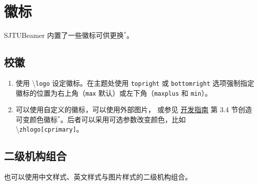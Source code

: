 \documentclass[
    UTF8,
    heading=true,
    12pt,
    a4paper
]{ctexrep}
\newenvironment{commentlist}
{\begin{enumerate}\small}
{\end{enumerate}}
\newcommand{\cmd}[1]{\textbackslash{}\texttt{#1}}
\newcommand{\opt}[1]{\texttt{#1}}
\def\themename{\textsf{SJTUBeamer}}
\begin{document}
\chapter{徽标}

\themename{} 内置了一些徽标可供更换$^*$。

\section{校徽}

\begin{tcbitemize}[raster rows=2, raster
    columns=3, raster every box/.style={
        center title,
        valign=center,
        halign=center,
        fonttitle=\ttfamily,
        colback=white}]
  \tcbitem[raster multicolumn=2,blankest]
  \begin{tcbitemize}[raster columns=2]
    \tcbitem[title={\cmd{zhlogo}}]
    \hbox{\resizebox{!}{1cm}{\zhlogo}}

    \tcbitem[title={\cmd{enlogo}}]
    \hbox{\resizebox{!}{1cm}{\enlogo}}

    \tcbitem[title={\cmd{sjtubadge}},height=3.5cm]
    \resizebox{!}{2cm}{\sjtubadge{}}

    \tcbitem[title={\cmd{dlogo}},height=3.5cm]
    \resizebox{3cm}{!}{\dlogo{}}
  \end{tcbitemize}
  \tcbitem[title={\cmd{vlogo}}]
  \resizebox{!}{4.8cm}{\vlogo{}}
\end{tcbitemize}


\begin{commentlist}
  \item 使用 \cmd{logo} 设定徽标。在主题处使用 \opt{topright}
  或 \opt{bottomright} 选项强制指定徽标的位置为右上角（\opt{max}
  默认）或左下角（\opt{maxplus} 和 \opt{min}）。
  \item 可以使用自定义的徽标，可以使用外部图片，
  或参见 \href{run:sjtubeamerdevguide.pdf}{开发指南}
  第 3.4 节创造可变颜色徽标$^*$。后者可以采用可选参数改变颜色，比如
  \cmd{zhlogo[cprimary]}。
\end{commentlist}

\section{二级机构组合}

也可以使用中文样式、英文样式与图片样式的二级机构组合。
\end{document}
